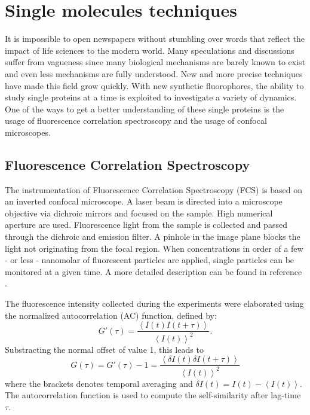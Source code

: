 \documentclass[twoside,single]{lion-msc}
\begin{document}
\section{Single molecules techniques}
It is impossible to open newspapers without stumbling over words that reflect the impact of life sciences to the modern world. Many speculations and discussions suffer from vagueness since many biological mechanisms are barely known to exist and even less mechanisms are fully understood. New and more precise techniques have made this field grow quickly. With new synthetic fluorophores, the ability to study single proteins at a time is exploited to investigate a variety of dynamics.  One of the ways to get a better understanding of these single proteins is the usage of fluorescence correlation spectroscopy and the usage of confocal microscopes. 

\subsection{Fluorescence Correlation Spectroscopy}
The instrumentation of Fluorescence Correlation Spectroscopy (FCS) is based on an inverted confocal microscope.  A laser beam is directed into a microscope objective via dichroic mirrors and focused on the sample. High numerical aperture are used. Fluorescence light from the sample is collected and passed through the dichroic and emission filter. A pinhole in the image plane blocks the light not originating from the focal region. When concentrations in order of a few - or less - nanomolar of fluorescent particles are applied, single particles can be monitored at a given time. A more detailed description can be found in reference \cite{Schwille}.

The fluorescence intensity collected during the experiments were elaborated using the normalized autocorrelation (AC) function, defined by:
\begin{equation}
G'(\tau) = \frac{\left \langle I(t)I(t + \tau) \right \rangle}{\left \langle I(t)\right \rangle ^{2}}.
\end{equation}
Substracting the normal offset of value 1, this leads to
\begin{equation} \label{AC}
G(\tau) = G'(\tau) - 1 =  \frac{\left \langle \delta I(t)\delta I(t + \tau) \right \rangle}{\left \langle I(t)\right \rangle ^{2}}
\end{equation}
where the brackets  denotes temporal averaging and $\delta I(t) = I(t) - \left \langle I(t)\right \rangle$. The autocorrelation function is used to compute the self-similarity after lag-time $\tau$.
\end{document}

